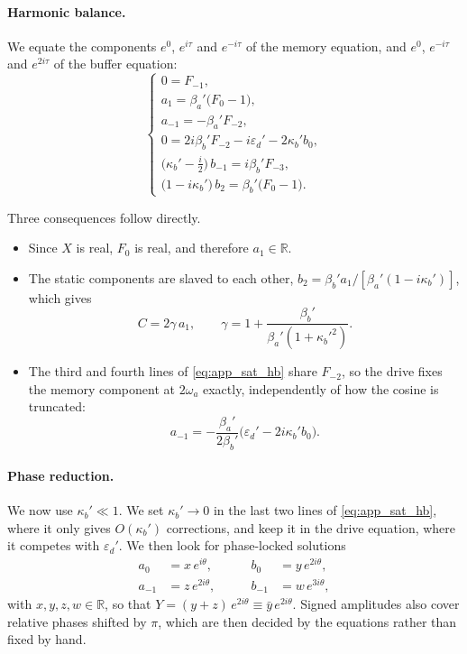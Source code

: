 \documentclass[aps,prx,reprint,floatfix,amsmath,amssymb,longbibliography]{revtex4-2}
\begin{document}
\paragraph*{Harmonic balance.}
We equate the components $e^{0}$, $e^{i\tau}$ and $e^{-i\tau}$ of the memory equation, and $e^{0}$, $e^{-i\tau}$ and $e^{2i\tau}$ of the buffer equation:
\begin{equation}
\begin{cases}
    0 = F_{-1},\\
    a_1 = \beta_a'\bigl(F_0-1\bigr),\\
    a_{-1} = -\beta_a' F_{-2},\\
    0 = 2i\beta_b'F_{-2} - i\varepsilon_d' - 2\kappa_b' b_0,\\
    \bigl(\kappa_b' - \tfrac{i}{2}\bigr)\,b_{-1} = i\beta_b' F_{-3},\\
    \bigl(1-i\kappa_b'\bigr)\,b_2 = \beta_b'\bigl(F_0-1\bigr).
\end{cases}
\label{eq:app_sat_hb}
\end{equation}

Three consequences follow directly.
\begin{itemize}
    \item Since $X$ is real, $F_0$ is real, and therefore $a_1\in\mathbb R$.
    \item The static components are slaved to each other, $b_2=\beta_b' a_1/[\beta_a'(1-i\kappa_b')]$, which gives
    \begin{equation}
        C = 2\gamma\,a_1,\qquad \gamma = 1+\frac{\beta_b'}{\beta_a'(1+\kappa_b'^2)} .
    \end{equation}
    \item The third and fourth lines of \cref{eq:app_sat_hb} share $F_{-2}$, so the drive fixes the memory component at $2\omega_a$ exactly, independently of how the cosine is truncated:
    \begin{equation}
        a_{-1} = -\frac{\beta_a'}{2\beta_b'}\bigl(\varepsilon_d' - 2i\kappa_b' b_0\bigr).
        \label{eq:app_am1}
    \end{equation}
\end{itemize}

\paragraph*{Phase reduction.}
We now use $\kappa_b'\ll1$. We set $\kappa_b'\to0$ in the last two lines of \cref{eq:app_sat_hb}, where it only gives $O(\kappa_b')$ corrections, and keep it in the drive equation, where it competes with $\varepsilon_d'$. We then look for phase-locked solutions
\begin{equation}
\begin{aligned}
    a_0 &= x\,e^{i\theta},&\qquad b_0 &= y\,e^{2i\theta},\\
    a_{-1} &= z\,e^{2i\theta},&\qquad b_{-1} &= w\,e^{3i\theta},
\end{aligned}
\end{equation}
with $x,y,z,w\in\mathbb R$,
so that $Y=(y+z)\,e^{2i\theta}\equiv \bar y\,e^{2i\theta}$. Signed amplitudes also cover relative phases shifted by $\pi$, which are then decided by the equations rather than fixed by hand.
\end{document}
